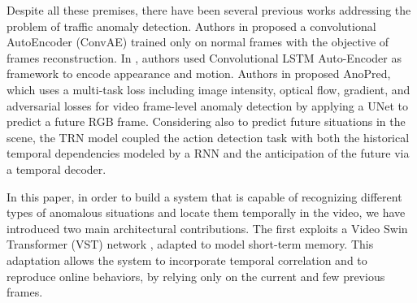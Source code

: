 Despite all these premises, there have been several previous works addressing the problem of traffic anomaly detection.
Authors in \cite{hasan2016learning} proposed a convolutional AutoEncoder (ConvAE) trained only on normal frames with the objective of frames reconstruction.
In \cite{luo2017remembering, wang2018abnormal}, authors used Convolutional LSTM Auto-Encoder as framework to encode appearance and motion. Authors in \cite{liu2018future} proposed AnoPred, which uses a multi-task loss including image intensity, optical flow, gradient, and adversarial losses for video frame-level anomaly detection by applying a UNet to predict a future RGB frame.
Considering also to predict future situations in the scene, the TRN model \cite{xu2019temporal} coupled the action detection task with both the historical temporal dependencies modeled by a RNN and the anticipation of the future via a temporal decoder. 

In this paper, in order to build a system that is capable of recognizing different types of anomalous situations  and locate them temporally in the video, we have introduced two main architectural contributions. The first exploits a Video Swin Transformer (VST) network \cite{liu_video_2022}, adapted to model short-term memory. This adaptation allows the system to incorporate temporal correlation and to reproduce online behaviors, by relying only on the current and few previous frames.

